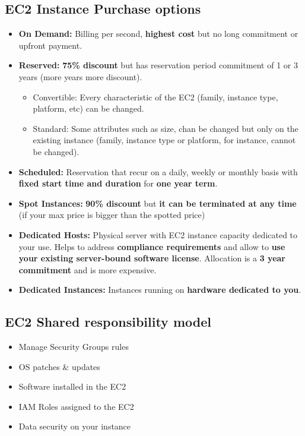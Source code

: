 \subsection{EC2 Instance Purchase options}\label{subsec:ec2-instance-purchase-options}
\begin{itemize}
	\item \textbf{On Demand:} Billing per second, \textbf{highest cost} but no long commitment or upfront payment.
	\item \textbf{Reserved:} \textbf{75\% discount} but has reservation period commitment of 1 or 3 years (more years more discount).
	\begin{itemize}
		\item {Convertible:} Every characteristic of the EC2 (family, instance type, platform, etc) can be changed.
		\item {Standard:} Some attributes such as size, chan be changed but only on the existing instance (family, instance type or platform, for instance, cannot be changed).
	\end{itemize}
	\item \textbf{Scheduled:} Reservation that recur on a daily, weekly or monthly basis with \textbf{fixed start time and duration} for \textbf{one year term}.
	\item \textbf{Spot Instances:} \textbf{90\% discount} but \textbf{it can be terminated at any time} (if your max price is bigger than the spotted price)
	\item \textbf{Dedicated Hosts:} Physical server with EC2 instance capacity dedicated to your use. Helps to address \textbf{compliance requirements} and allow to \textbf{use your existing server-bound software license}. Allocation is a \textbf{3 year commitment} and is more expensive.
	\item \textbf{Dedicated Instances:} Instances running on \textbf{hardware dedicated to you}.
\end{itemize}

\subsection{EC2 Shared responsibility model}\label{subsec:ec2-shared-responsibility-model}
\begin{itemize}
	\item{Manage Security Groups rules}
	\item{OS patches \& updates}
	\item{Software installed in the EC2}
	\item{IAM Roles assigned to the EC2}
	\item{Data security on your instance}
\end{itemize}